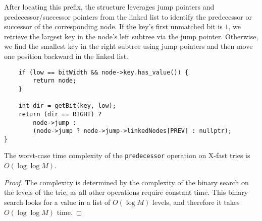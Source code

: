After locating this prefix, the structure leverages jump pointers and predecessor/successor pointers from the linked list to identify the predecessor or successor of the corresponding node. If the key's first unmatched bit is \(1\), we retrieve the largest key in the node’s left subtree via the jump pointer. Otherwise, we find the smallest key in the right subtree using jump pointers and then move one position backward in the linked list.

\begin{verbatim}
    if (low == bitWidth && node->key.has_value()) {
        return node;
    }

    int dir = getBit(key, low);
    return (dir == RIGHT) ? 
        node->jump :
        (node->jump ? node->jump->linkedNodes[PREV] : nullptr);
}
\end{verbatim}

\begin{lemma}
The worst-case time complexity of the \texttt{predecessor} operation on X-fast tries is \( O(\log \log M) \).
\end{lemma}

\begin{proof}
The complexity is determined by the complexity of the binary search on the levels of the trie, as all other operations require constant time. This binary search looks for a value in a list of \( O(\log M) \) levels, and therefore it takes \( O(\log \log M) \) time.
\end{proof}
